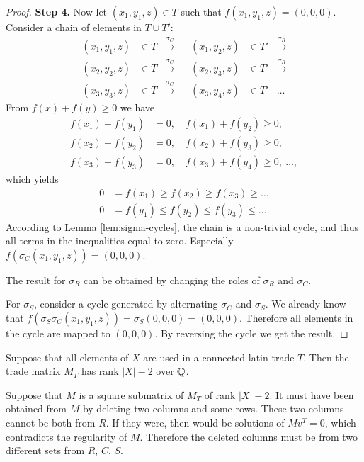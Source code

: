 \begin{proof}
%
%
\item \textbf{Step 4.}
Now let $(x_1,y_1,z) \in T$ such that $f(x_1,y_1,z)=(0,0,0)$. Consider a chain of elements in $T \cup T'$:
\begin{align*}
	(x_1,y_1,z) &\in T &\xrightarrow{\sigma_C}& &(x_1,y_2,z) &\in T' & \xrightarrow{\sigma_R} \\
	(x_2,y_2,z) &\in T &\xrightarrow{\sigma_C}& &(x_2,y_3,z) &\in T' & \xrightarrow{\sigma_R} \\
	(x_3,y_3,z) &\in T &\xrightarrow{\sigma_C}& &(x_3,y_4,z) &\in T' & \dots
\end{align*}
From $f(x) + f(y) \geq 0$ we have
\begin{align*}
	f(x_1) + f(y_1) &= 0, \quad f(x_1) + f(y_2) \geq 0, \\
	f(x_2) + f(y_2) &= 0, \quad f(x_2) + f(y_3) \geq 0, \\
	f(x_3) + f(y_3) &= 0, \quad f(x_3) + f(y_4) \geq 0,\ \dots, 
\end{align*}
which yields
\begin{align*}
	0 &= f(x_1) \geq f(x_2) \geq f(x_3) \geq \dots \\
	0 &= f(y_1) \leq f(y_2) \leq f(y_3) \leq \dots
\end{align*}
According to Lemma \ref{lem:sigma-cycles}, the chain is a non-trivial cycle, and thus all terms in the inequalities equal to zero. Especially $f(\sigma_C(x_1,y_1,z)) = (0,0,0)$.

The result for $\sigma_R$ can be obtained by changing the roles of $\sigma_R$ and $\sigma_C$.

For $\sigma_S$, consider a cycle generated by alternating $\sigma_C$ and $\sigma_S$. We already know that $f(\sigma_S\sigma_C(x_1,y_1,z)) = \sigma_S(0,0,0) = (0,0,0)$. Therefore all elements in the cycle are mapped to $(0,0,0)$. By reversing the cycle we get the result.

\end{proof}

\begin{cor}
\label{cor:rank-mt}
Suppose that all elements of $X$ are used in a connected latin trade $T$. Then the trade matrix $M_T$ has rank $|X|-2$ over $\mathbb Q$.
\end{cor}

\begin{note}
Suppose that $M$ is a square submatrix of $M_T$ of rank $|X|-2$. It must have been obtained from $M$ by deleting two columns and some rows. These two columns cannot be both from $R$. If they were, then
%
would be solutions of $Mv^T = 0$, which contradicts the regularity of $M$. Therefore the deleted columns must be from two different sets from $R$, $C$, $S$.
\end{note}


